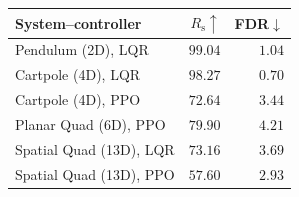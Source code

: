 \begin{tabular}{lrr}
\toprule
\textbf{System--controller} & $R_{\mathrm{s}}\uparrow$ & FDR$\downarrow$ \\
\midrule
Pendulum (2D), LQR & $99.04$ & $1.04$ \\
Cartpole (4D), LQR & $98.27$ & $0.70$ \\
Cartpole (4D), PPO & $72.64$ & $3.44$ \\
Planar Quad (6D), PPO & $79.90$ & $4.21$ \\
Spatial Quad (13D), LQR & $73.16$ & $3.69$ \\
Spatial Quad (13D), PPO & $57.60$ & $2.93$ \\
\bottomrule
\end{tabular}
